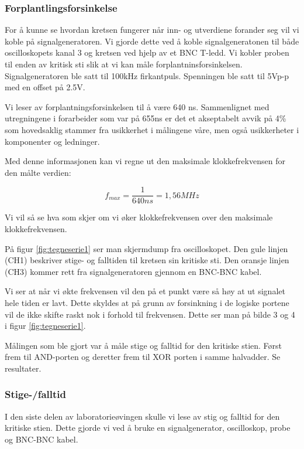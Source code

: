 \documentclass{article}
\begin{document}
\subsubsection{Forplantlingsforsinkelse}
For å kunne se hvordan kretsen fungerer når inn- og utverdiene forander seg vil vi koble på signalgeneratoren. Vi gjorde dette ved å koble signalgeneratonen til både oscilloskopets kanal 3 og kretsen ved hjelp av et BNC T-ledd. Vi kobler proben til enden av kritisk sti slik at vi kan måle forplantninsforsinkelsen. Signalgeneratoren ble satt til 100kHz firkantpuls. Spenningen ble satt til 5Vp-p med en offset på 2.5V.

Vi leser av forplantningsforsinkelsen til å være 640 ns. Sammenlignet med utregningene i forarbeider som var på 655ns er det et akseptabelt avvik på 4\% som hovedsaklig stammer fra usikkerhet i målingene våre, men også usikkerheter i komponenter og ledninger.

Med denne informasjonen kan vi regne ut den maksimale klokkefrekvensen for den målte verdien:

\begin{equation}
	f_{max} = \frac{1}{640ns} = 1,56 MHz
\end{equation}

Vi vil så se hva som skjer om vi øker klokkefrekvensen over den maksimale klokkefrekvensen.


På figur \ref{fig:tegneserie1} ser man skjermdump fra oscilloskopet. Den gule linjen (CH1) beskriver stige- og falltiden til kretsen sin kritiske sti. Den oransje linjen (CH3) kommer rett fra signalgeneratoren gjennom en BNC-BNC kabel.

Vi ser at når vi økte frekvensen vil den på et punkt være så høy at ut signalet hele tiden er lavt. Dette skyldes at på grunn av forsinkning i de logiske portene vil de ikke skifte raskt nok i forhold til frekvensen. Dette ser man på bilde 3 og 4 i figur \ref{fig:tegneserie1}.

Målingen som ble gjort var å måle stige og falltid for den kritiske stien. Først frem til AND-porten og deretter frem til XOR porten i samme halvadder. Se resultater.


\subsubsection{Stige-/falltid}
I den siste delen av laboratorieøvingen skulle vi lese av stig og falltid for den kritiske stien. Dette gjorde vi ved å bruke en signalgenerator, oscilloskop, probe og BNC-BNC kabel.
\end{document}
